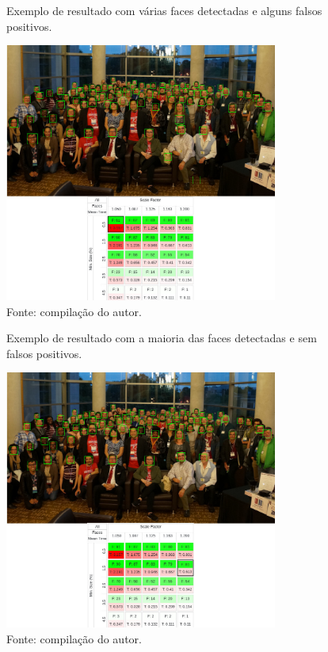 \begin{figure}[h]
    \centering
    \caption[Exemplo de resultado com várias faces detectadas e alguns falsos positivos.]{Exemplo de resultado com várias faces detectadas e alguns falsos positivos.}
    \includegraphics[width=0.8\textwidth]{Cap3_Desenvolvimento/Figures/exemplo_resultado_2.jpg}
    \caption*{Fonte: compilação do autor.\footnotemark[\value{footnote}]}
    \label{fig:exemploResultado2}
\end{figure}

\begin{figure}[h]
    \centering
    \caption[Exemplo de resultado com a maioria das faces detectadas e sem falsos positivos.]{Exemplo de resultado com a maioria das faces detectadas e sem falsos positivos.}
    \includegraphics[width=0.8\textwidth]{Cap3_Desenvolvimento/Figures/exemplo_resultado_3.jpg}
    \caption*{Fonte: compilação do autor.\footnotemark[\value{footnote}]}
    \label{fig:exemploResultado3}
\end{figure}


